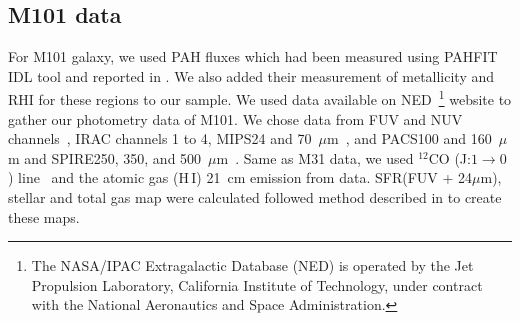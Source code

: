     \subsection{M101 data}
     For M101 galaxy, we used PAH fluxes which had been measured using {\tiny PAHFIT IDL} tool and reported in \cite{Gordon08}.
     We also added their measurement of metallicity and RHI for these regions to our sample.
     We used data available on NED~\footnote{The NASA/IPAC Extragalactic Database (NED) is operated by the Jet Propulsion Laboratory, California Institute of Technology, under contract with the National Aeronautics and Space Administration.} website to gather our photometry data of M101. 
     We chose data from \GALEX FUV and NUV channels~\citep{depaz07}, IRAC channels 1 to 4, MIPS24 and 70~$\mu$m~\cite{Dale09}, and  PACS100 and 160~$\mu$m and SPIRE250, 350, and 500~$\mu$m~\cite{Kennicutt11}.
     Same as M31 data, we used $^{12}$CO (J:$1\rightarrow0$) line~\citep{Helfer03} and the atomic gas (H\,{\sc I}) 21~cm emission from \cite{Walter08} data.
     SFR(FUV + 24$\mu$m), stellar and total gas map were calculated followed method described in \cite{Rahmani16} to create these maps.
     